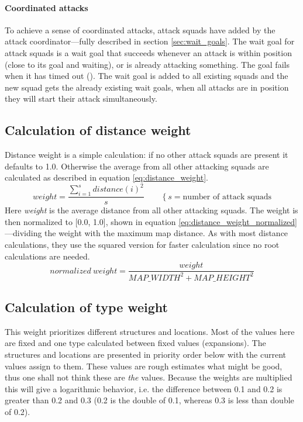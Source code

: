 \paragraph{Coordinated attacks}
To achieve a sense of coordinated attacks, attack squads have  added by the attack coordinator—fully described in section \ref{sec:wait_goals}. The wait goal for attack squads is a wait goal that succeeds whenever an attack is within position (close to its goal and waiting), or is already attacking something. The goal fails when it has timed out (\attackCoordinatorWaitGoalTimeout). The wait goal is added to all existing squads and the new squad gets the already existing wait goals, when all attacks are in position they will start their attack simultaneously.

\subsection{Calculation of distance weight}
Distance weight is a simple calculation: if no other attack squads are present it defaults to 1.0. Otherwise the average from all other attacking squads are calculated as described in equation \ref{eq:distance_weight}.
\begin{equation}
\label{eq:distance_weight}
weight = \frac{\sum_{i=1}^{s}{distance(i)^2}}{s} \qquad \left\{s = \text{number of attack squads}\right.
\end{equation}
Here \emph{weight} is the average distance from all other attacking squads. The weight is then normalized to [0.0, 1.0], shown in equation \ref{eq:distance_weight_normalized}—dividing the weight with the maximum map distance. As with most distance calculations, they use the squared version for faster calculation since no root calculations are needed.
\begin{equation}
\label{eq:distance_weight_normalized}
normalized\ weight = \frac{weight}{MAP\_WIDTH^2 + MAP\_HEIGHT^2}
\end{equation}


\subsection{Calculation of type weight}
This weight prioritizes different structures and locations. Most of the values here are fixed and one type calculated between fixed values (expansions). The structures and locations are presented in priority order below with the current values assign to them. These values are rough estimates what might be good, thus one shall not think these are \emph{the} values. Because the weights are multiplied this will give a logarithmic behavior, i.e. the difference between 0.1 and 0.2 is greater than 0.2 and 0.3 (0.2 is the double of 0.1, whereas 0.3 is less than double of 0.2).

